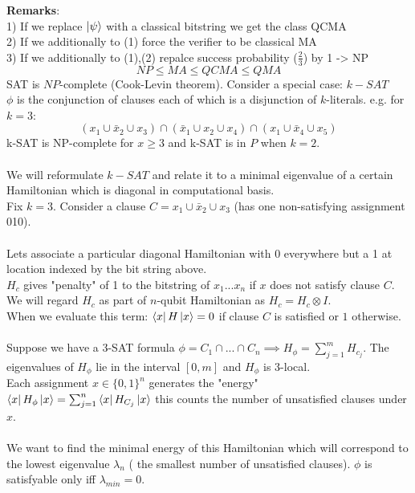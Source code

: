\documentclass{article}
\begin{document}
\textbf{Remarks}:\\
1) If we replace $\ket{\psi}$ with a classical bitstring we get the class QCMA\\
2) If we additionally to (1) force the verifier to be classical MA\\
3) If we additionally to (1),(2) repalce success probability ($\frac{2}{3}$) by 1 -> NP
$$
NP \leq MA \leq QCMA \leq QMA
$$
SAT is $NP$-complete (Cook-Levin theorem). Consider a special case: $k-SAT$\\
$\phi$ is the conjunction of clauses each of which is a disjunction of $k$-literals. e.g. for $k=3$:
$$
( x_1 \cup \bar x_2 \cup x_3) \cap ( \bar x_1 \cup x_2 \cup x_4) \cap (x_1 \cup \bar x_4 \cup x_5)
$$
k-SAT is NP-complete for $x \geq 3$ and k-SAT is in $P$ when $k=2$.\\\\
We will reformulate $k-SAT$ and relate it to a minimal eigenvalue of a certain Hamiltonian which is diagonal in computational basis.\\
Fix $k=3$. Consider a clause $C = x_1 \cup \bar x_2 \cup x_3$ (has one non-satisfying assignment 010).\\\\
               Lets associate a particular diagonal Hamiltonian with 0 everywhere but a 1 at location indexed by the bit string above.\\
               $H_c$ gives "penalty" of 1 to the bitstring of $x_1...x_n$ if $x$ does not satisfy clause $C$.\\
               We will regard $H_c$ as part of $n$-qubit Hamiltonian as $H_c = H_c \otimes I$.\\
               When we evaluate this term: $\bra{x} H \ket{x} = 0$ if clause $C$ is satisfied or $1$ otherwise.\\\\
               Suppose we have a 3-SAT formula $\phi = C_1 \cap ... \cap C_n \implies H_{\phi} = \sum_{j=1}^m H_{c_j}$. The eigenvalues of $H_{\phi}$ lie in the interval $[0,m]$ and $H_{\phi}$ is 3-local.\\
                       Each assignment $x \in \{0,1\}^n$ generates the "energy"\\
                       $\bra{x} H_{\phi} \ket{x} = \sum_{j=1}^n \bra{x} H_{C_j} \ket{x}$ this counts the number of unsatisfied clauses under $x$.\\\\
                       We want to find the minimal energy of this Hamiltonian which will correspond to the lowest eigenvalue $\lambda_n$ ( the smallest number of unsatisfied clauses). $\phi$ is satisfyable only iff $\lambda_{min} = 0$.
\end{document}
